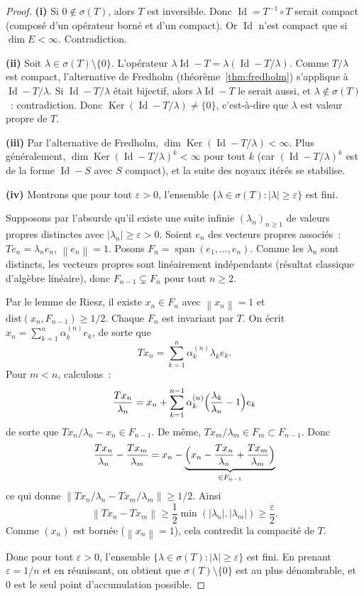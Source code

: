 \documentclass[a4paper,12pt]{book}
\DeclareMathOperator{\Id}{Id}
\DeclareMathOperator{\Ker}{Ker}
\DeclareMathOperator{\spn}{span}
\newcommand{\norm}[1]{\left\| #1 \right\|}
\newcommand{\abs}[1]{\left| #1 \right|}
\theoremstyle{definition}
\theoremstyle{plain}
\theoremstyle{remark}
\begin{document}
\begin{proof}
\textbf{(i)} Si $0 \notin \sigma(T)$, alors $T$ est inversible. Donc
$\Id = T^{-1} \circ T$ serait compact (composé d'un opérateur borné et d'un compact).
Or $\Id$ n'est compact que si $\dim E < \infty$. Contradiction.

\textbf{(ii)} Soit $\lambda \in \sigma(T) \setminus \{0\}$. L'opérateur
$\lambda \Id - T = \lambda(\Id - T/\lambda)$. Comme $T/\lambda$ est compact,
l'alternative de Fredholm (théorème~\ref{thm:fredholm}) s'applique à $\Id - T/\lambda$.
Si $\Id - T/\lambda$ était bijectif, alors $\lambda\Id - T$ le serait aussi, et
$\lambda \notin \sigma(T)$~: contradiction. Donc $\Ker(\Id - T/\lambda) \neq \{0\}$,
c'est-à-dire que $\lambda$ est valeur propre de $T$.

\textbf{(iii)} Par l'alternative de Fredholm,
$\dim \Ker(\Id - T/\lambda) < \infty$. Plus généralement,
$\dim \Ker(\Id - T/\lambda)^k < \infty$ pour tout $k$ (car $(\Id - T/\lambda)^k$ est de
la forme $\Id - S$ avec $S$ compact), et la suite des noyaux itérés se stabilise.

\textbf{(iv)} Montrons que pour tout $\varepsilon > 0$, l'ensemble
$\{\lambda \in \sigma(T) : \abs{\lambda} \ge \varepsilon\}$ est fini.

Supposons par l'absurde qu'il existe une suite infinie $(\lambda_n)_{n \ge 1}$ de valeurs
propres distinctes avec $\abs{\lambda_n} \ge \varepsilon > 0$. Soient $e_n$ des vecteurs
propres associés~: $Te_n = \lambda_n e_n$, $\norm{e_n} = 1$. Posons
$F_n = \spn(e_1, \ldots, e_n)$. Comme les $\lambda_n$ sont distincts, les vecteurs
propres sont linéairement indépendants (résultat classique d'algèbre linéaire), donc
$F_{n-1} \subsetneq F_n$ pour tout $n \ge 2$.

Par le lemme de Riesz, il existe $x_n \in F_n$ avec $\norm{x_n} = 1$ et
$\mathrm{dist}(x_n, F_{n-1}) \ge 1/2$. Chaque $F_n$ est invariant par $T$. On écrit
$x_n = \sum_{k=1}^n \alpha_k^{(n)} e_k$, de sorte que
\[
  Tx_n = \sum_{k=1}^n \alpha_k^{(n)} \lambda_k e_k.
\]
Pour $m < n$, calculons~:
\[
  \frac{Tx_n}{\lambda_n} = x_n + \sum_{k=1}^{n-1} \alpha_k^{(n)}
    \Bigl(\frac{\lambda_k}{\lambda_n} - 1\Bigr) e_k
\]
de sorte que $Tx_n / \lambda_n - x_n \in F_{n-1}$. De même,
$Tx_m / \lambda_m \in F_m \subset F_{n-1}$. Donc
\[
  \frac{Tx_n}{\lambda_n} - \frac{Tx_m}{\lambda_m}
    = x_n - \underbrace{\Bigl(x_n - \frac{Tx_n}{\lambda_n}
      + \frac{Tx_m}{\lambda_m}\Bigr)}_{\in F_{n-1}}
\]
ce qui donne $\norm{Tx_n/\lambda_n - Tx_m/\lambda_m} \ge 1/2$. Ainsi
\[
  \norm{Tx_n - Tx_m}
    \ge \frac{1}{2}\min(\abs{\lambda_n}, \abs{\lambda_m})
    \ge \frac{\varepsilon}{2}.
\]
Comme $(x_n)$ est bornée ($\norm{x_n} = 1$), cela contredit la compacité de $T$.

Donc pour tout $\varepsilon > 0$, l'ensemble
$\{\lambda \in \sigma(T) : \abs{\lambda} \ge \varepsilon\}$ est fini. En prenant
$\varepsilon = 1/n$ et en réunissant, on obtient que $\sigma(T) \setminus \{0\}$ est au
plus dénombrable, et $0$ est le seul point d'accumulation possible.
\end{proof}
\end{document}
